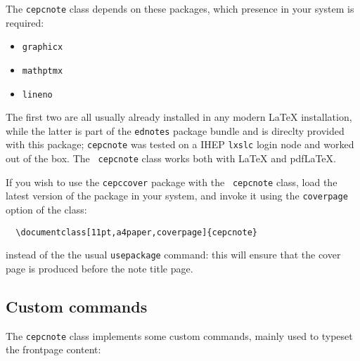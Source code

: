 \documentclass[11pt,a4paper]{cepcnote}
\begin{document}
The {\tt cepcnote} class depends on these packages, which presence in
your system is required:
\begin{itemize}
  \item {\tt graphicx}
  \item {\tt mathptmx}
  \item {\tt lineno}
\end{itemize}
The first two are all usually already installed in any modern \LaTeX{}
installation, while the latter is part of the {\tt ednotes} package
bundle and is direclty provided with this package; {\tt cepcnote} was
tested on a IHEP {\tt lxslc} login node and worked out of the box. The {\tt
  cepcnote} class works both with \LaTeX{} and pdf\LaTeX{}.

If you wish to use the {\tt cepccover} package with the {\tt
  cepcnote} class, load the latest version of the package in your
system, and invoke it using the {\tt coverpage} option of the class:
\begin{verbatim}
  \documentclass[11pt,a4paper,coverpage]{cepcnote}
\end{verbatim}
instead of the the usual {\tt usepackage} command: this will ensure
that the cover page is produced before the note title page.

\subsection{Custom commands}

The {\tt cepcnote} class implements some custom commands, mainly
used to typeset the frontpage content:
\end{document}
